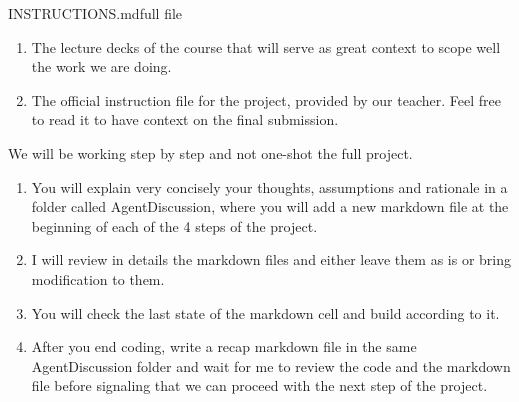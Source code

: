 \begin{mdfile}{INSTRUCTIONS.md}{full file}

\begin{enumerate}
\def\labelenumi{\arabic{enumi}.}
\tightlist
\item
  The lecture decks of the course that will serve as great context to scope well the work we are doing.
\item
  The official instruction file for the project, provided by our teacher. Feel free to read it to have context on the final submission.
\end{enumerate}


We will be working step by step and not one-shot the full project.

\begin{enumerate}
\def\labelenumi{\arabic{enumi}.}
\tightlist
\item
  You will explain very concisely your thoughts, assumptions and rationale in a folder called AgentDiscussion, where you will add a new markdown file at the beginning of each of the 4 steps of the project.
\item
  I will review in details the markdown files and either leave them as is or bring modification to them.
\item
  You will check the last state of the markdown cell and build according to it.
\item
  After you end coding, write a recap markdown file in the same AgentDiscussion folder and wait for me to review the code and the markdown file before signaling that we can proceed with the next step of the project.
\end{enumerate}
\end{mdfile}
